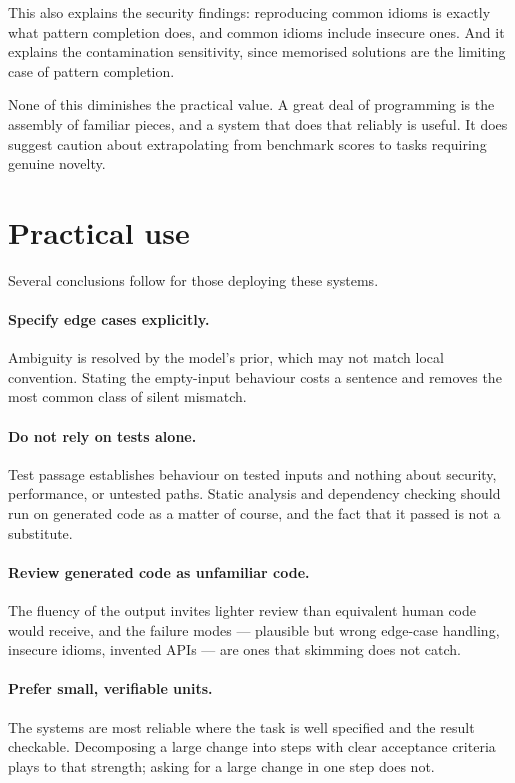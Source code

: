 \documentclass[11pt,a4paper]{article}
\begin{document}
This also explains the security findings: reproducing common idioms is exactly
what pattern completion does, and common idioms include insecure ones. And it
explains the contamination sensitivity, since memorised solutions are the
limiting case of pattern completion.

None of this diminishes the practical value. A great deal of programming is
the assembly of familiar pieces, and a system that does that reliably is
useful. It does suggest caution about extrapolating from benchmark scores to
tasks requiring genuine novelty.

\section{Practical use}
\label{sec:practice}

Several conclusions follow for those deploying these systems.

\paragraph{Specify edge cases explicitly.}
Ambiguity is resolved by the model's prior, which may not match local
convention. Stating the empty-input behaviour costs a sentence and removes the
most common class of silent mismatch.

\paragraph{Do not rely on tests alone.}
Test passage establishes behaviour on tested inputs and nothing about
security, performance, or untested paths. Static analysis and dependency
checking should run on generated code as a matter of course, and the fact that
it passed is not a substitute.

\paragraph{Review generated code as unfamiliar code.}
The fluency of the output invites lighter review than equivalent human code
would receive, and the failure modes --- plausible but wrong edge-case
handling, insecure idioms, invented APIs --- are ones that skimming does not
catch.

\paragraph{Prefer small, verifiable units.}
The systems are most reliable where the task is well specified and the result
checkable. Decomposing a large change into steps with clear acceptance
criteria plays to that strength; asking for a large change in one step does
not.
\end{document}
